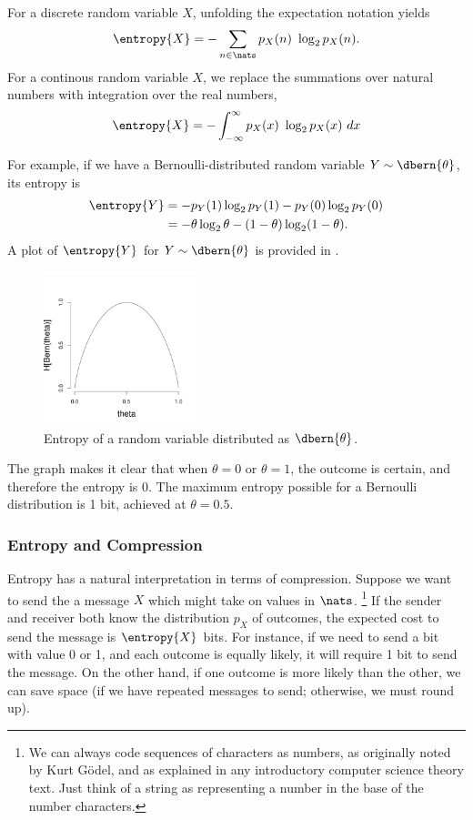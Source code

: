 For a discrete random variable $X$, unfolding the expectation notation
yields
%
\begin{equation}
\entropy{X} = - \sum_{n \in \nats} p_X(n) \ \log_2 p_X(n).
\end{equation}
%
For a continous random variable $X$, we replace the summations
over natural numbers with integration over the real numbers,
%
\begin{equation}
\entropy{X} = - \int_{-\infty}^{\infty} p_X(x) \ \log_2 p_X(x) \ dx
\end{equation}

For example, if we have a Bernoulli-distributed random
variable $Y \sim \dbern{\theta}$, its entropy is
%
\begin{align}
\entropy{Y} &= - p_Y(1) \log_2 p_Y(1) - p_Y(0) \log_2 p_Y(0)
\\
&= - \theta \log_2 \theta - (1 - \theta) \log_2 (1 - \theta).
\end{align}
%
A plot of $\entropy{Y}$ for $Y \sim \dbern{\theta}$ is provided
in .
%
\begin{figure}
\begin{center}
\includegraphics[height=1.75in]{pdfs/bern-entropy.pdf}
\end{center}%
\vspace*{-18pt}
\caption{Entropy of a random variable distributed as $\dbern{\theta}$.}\label{fig:bern-entropy}
\end{figure}
%
The graph makes it clear that when $\theta=0$ or $\theta=1$, the
outcome is certain, and therefore the entropy is 0.  The maximum
entropy possible for a Bernoulli distribution is 1 bit, achieved at
$\theta = 0.5$.  


\subsubsection{Entropy and Compression}

Entropy has a natural interpretation in terms of compression.  Suppose
we want to send the a message $X$ which might take on values in
$\nats$.%
%
\footnote{We can always code sequences of characters as numbers, as
originally noted by Kurt G\"odel, and as explained in any introductory
computer science theory text.  Just think of a string as representing
a number in the base of the number characters.}
%
If the sender and receiver both know the distribution $p_X$
of outcomes, the expected cost to send the message is $\entropy{X}$
bits.  For instance, if we need to send a bit with value 0 or 1, and
each outcome is equally likely, it will require 1 bit to send the
message.  On the other hand, if one outcome is more likely than the
other, we can save space (if we have repeated messages to send;
otherwise, we must round up).


